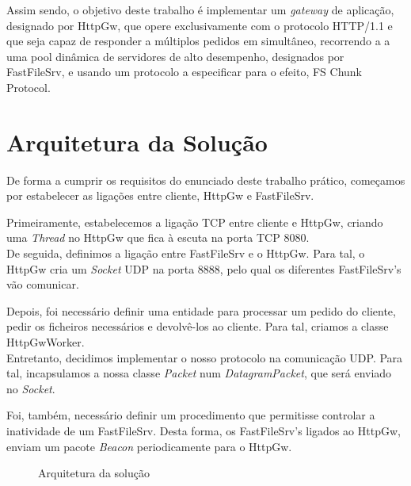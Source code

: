 \documentclass[11pt]{article}
\begin{document}
\par Assim sendo, o objetivo deste trabalho é implementar um \textit{gateway} de aplicação, designado por HttpGw, que opere exclusivamente com o protocolo HTTP/1.1
e que seja capaz de responder a múltiplos pedidos em simultâneo, recorrendo a a uma pool dinâmica de servidores de alto desempenho, designados por FastFileSrv, e usando um protocolo a especificar para o efeito, FS Chunk Protocol.


\section{Arquitetura da Solução}

De forma a cumprir os requisitos do enunciado deste trabalho prático, começamos por estabelecer as ligações entre cliente, HttpGw e FastFileSrv.

Primeiramente, estabelecemos a ligação TCP entre cliente e HttpGw, criando uma \textit{Thread} no HttpGw que fica à escuta na porta TCP 8080.\\

De seguida, definimos a ligação entre FastFileSrv e o HttpGw. Para tal, o HttpGw cria um \textit{Socket} UDP na porta 8888, pelo qual os diferentes FastFileSrv's vão comunicar.

Depois, foi necessário definir uma entidade para processar um pedido do cliente, pedir os ficheiros necessários e devolvê-los ao cliente. Para tal, criamos a classe HttpGwWorker.\\

Entretanto, decidimos implementar o nosso protocolo na comunicação UDP. Para tal, incapsulamos a nossa classe \textit{Packet} num \textit{DatagramPacket}, que será enviado no \textit{Socket}.

Foi, também, necessário definir um procedimento que permitisse controlar a inatividade de um FastFileSrv. Desta forma, os FastFileSrv's ligados ao HttpGw, enviam um pacote \textit{Beacon} periodicamente para o HttpGw.


\begin{figure}[H]
    \centering
    \caption{Arquitetura da solução}
\end{figure}
\end{document}
